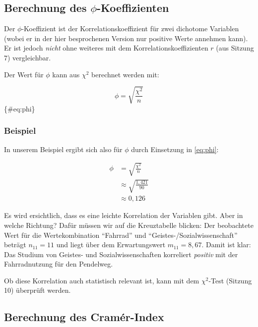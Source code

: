\documentclass[
  ngerman,
]{article}
\begin{document}
\hypertarget{berechnung-des-phi-koeffizienten}{%
\subsection{\texorpdfstring{Berechnung des \(\phi\)-Koeffizienten}{Berechnung des \textbackslash phi-Koeffizienten}}\label{berechnung-des-phi-koeffizienten}}

Der \(\phi\)-Koeffizient ist der Korrelationskoeffizient für zwei dichotome Variablen (wobei er in der hier besprochenen Version nur positive Werte annehmen kann). Er ist jedoch \emph{nicht} ohne weiteres mit dem Korrelationskoeffizienten \(r\) (aus Sitzung 7) vergleichbar.

Der Wert für \(\phi\) kann aus \(\chi^2\) berechnet werden mit:

\nopagebreak

\[
\phi=\sqrt{\frac{\chi^2}{n}}
\]\{\#eq:phi\}

\hypertarget{beispiel-33}{%
\subsubsection{Beispiel}\label{beispiel-33}}

In unserem Beispiel ergibt sich also für \(\phi\) durch Einsetzung in \autoref{eq:phi}:

\nopagebreak

\[\begin{aligned}
\phi&=\sqrt{\frac{\chi^2}{n}}\\[6pt]
    &\approx\sqrt{\frac{1,421}{90}}\\[4pt]
    &\approx0,126
\end{aligned}\]

Es wird ersichtlich, dass es eine leichte Korrelation der Variablen gibt. Aber in welche Richtung? Dafür müssen wir auf die Kreuztabelle blicken: Der beobachtete Wert für die Wertekombination ``Fahrrad'' und ``Geistes-/Sozialwissenschaft'' beträgt \(n_{11}=11\) und liegt über dem Erwartungswert \(m_{11}=8,67\). Damit ist klar: Das Studium von Geistes- und Sozialwissenschaften korreliert \emph{positiv} mit der Fahrradnutzung für den Pendelweg.

Ob diese Korrelation auch statistisch relevant ist, kann mit dem \(\chi^2\)-Test (Sitzung 10) überprüft werden.

\hypertarget{berechnung-des-cramuxe9r-index}{%
\subsection{Berechnung des Cramér-Index}\label{berechnung-des-cramuxe9r-index}}
\end{document}
